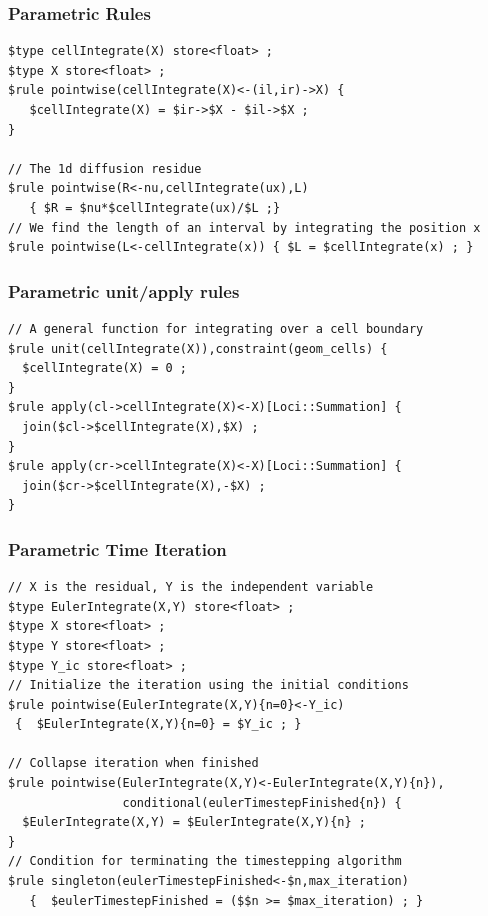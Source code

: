 \documentclass{beamer}
\begin{document}
\begin{frame}[fragile=singleslide]\frametitle{Parametric Rules}
\scriptsize
\begin{verbatim}
$type cellIntegrate(X) store<float> ;
$type X store<float> ;
$rule pointwise(cellIntegrate(X)<-(il,ir)->X) {
   $cellIntegrate(X) = $ir->$X - $il->$X ;
}

// The 1d diffusion residue
$rule pointwise(R<-nu,cellIntegrate(ux),L) 
   { $R = $nu*$cellIntegrate(ux)/$L ;}
// We find the length of an interval by integrating the position x
$rule pointwise(L<-cellIntegrate(x)) { $L = $cellIntegrate(x) ; }
\end{verbatim}
\end{frame}
\begin{frame}[fragile=singleslide]\frametitle{Parametric unit/apply rules }
\scriptsize
\begin{verbatim}
// A general function for integrating over a cell boundary
$rule unit(cellIntegrate(X)),constraint(geom_cells) {
  $cellIntegrate(X) = 0 ;
}
$rule apply(cl->cellIntegrate(X)<-X)[Loci::Summation] {
  join($cl->$cellIntegrate(X),$X) ;
}
$rule apply(cr->cellIntegrate(X)<-X)[Loci::Summation] {
  join($cr->$cellIntegrate(X),-$X) ;
}
\end{verbatim}
\end{frame}
\begin{frame}[fragile=singleslide]\frametitle{Parametric Time Iteration}
\scriptsize
\begin{verbatim}
// X is the residual, Y is the independent variable
$type EulerIntegrate(X,Y) store<float> ;
$type X store<float> ;
$type Y store<float> ;
$type Y_ic store<float> ;
// Initialize the iteration using the initial conditions
$rule pointwise(EulerIntegrate(X,Y){n=0}<-Y_ic) 
 {  $EulerIntegrate(X,Y){n=0} = $Y_ic ; }

// Collapse iteration when finished
$rule pointwise(EulerIntegrate(X,Y)<-EulerIntegrate(X,Y){n}),
                conditional(eulerTimestepFinished{n}) {
  $EulerIntegrate(X,Y) = $EulerIntegrate(X,Y){n} ; 
}
// Condition for terminating the timestepping algorithm
$rule singleton(eulerTimestepFinished<-$n,max_iteration) 
   {  $eulerTimestepFinished = ($$n >= $max_iteration) ; }
\end{verbatim}
\end{frame}
\end{document}
